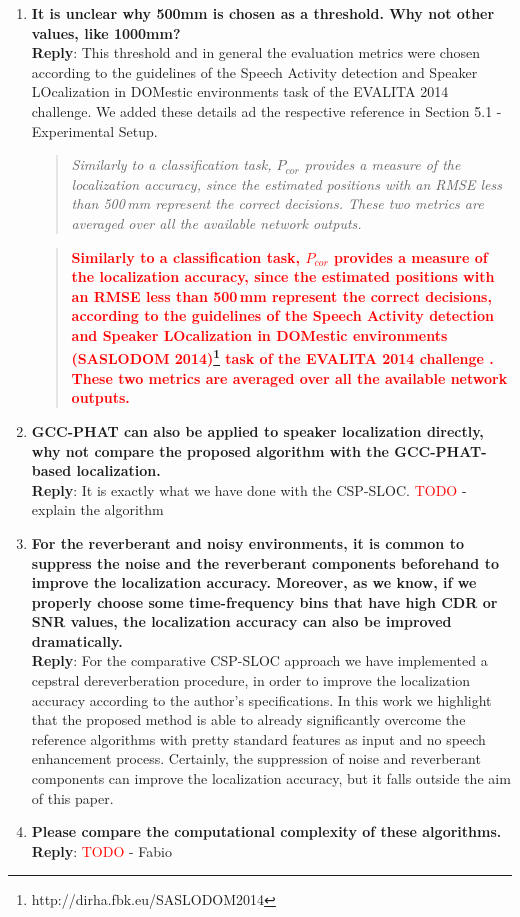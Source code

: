 \documentclass[11pt, technote, letterpaper, oneside, onecolumn]{IEEEtran}
\begin{document}
\begin{enumerate}
\item  \textbf{It is unclear why 500mm is chosen as a threshold. Why not other values, like 1000mm?\\}
\textbf{Reply}: This threshold and in general the evaluation metrics were chosen according to the guidelines of the Speech Activity detection and Speaker LOcalization in DOMestic environments task of the EVALITA 2014 challenge. We added these details ad the respective reference in Section 5.1 - Experimental Setup.
\begin{quote}
	\textit{Similarly to a classification task, $P_{cor}$ provides a measure of the localization accuracy, since the estimated positions with an RMSE less than 500\,mm represent the correct decisions. These two metrics are averaged over all the available network outputs.}
\end{quote}

\begin{quote}
	\textcolor{red}{\textbf{Similarly to a classification task, $P_{cor}$ provides a measure of the localization accuracy, since the estimated positions with an RMSE less than 500\,mm represent the correct decisions, according to the guidelines of the Speech Activity detection and Speaker LOcalization in DOMestic environments (SASLODOM 2014)\footnote{http://dirha.fbk.eu/SASLODOM2014} task of the EVALITA 2014 challenge \cite{basili2014proceedings}. These two metrics are averaged over all the available network outputs.}}
\end{quote}

\item  \textbf{GCC-PHAT can also be applied to speaker localization directly, why not compare the proposed algorithm with the GCC-PHAT-based localization. \\}
\textbf{Reply}:  It is exactly what we have done with the CSP-SLOC. \textcolor{red}{TODO} - explain the algorithm

\item  \textbf{For the reverberant and noisy environments, it is common to suppress the noise and the reverberant components beforehand to improve the localization accuracy. Moreover, as we know, if we properly choose some time-frequency bins that have high CDR or SNR values, the localization accuracy can also be improved dramatically.\\}
\textbf{Reply}: For the comparative CSP-SLOC approach we have implemented a cepstral dereverberation procedure, in order to improve the localization accuracy according to the author's specifications. In this work we highlight that the proposed method is able to already significantly overcome the reference algorithms with pretty standard features as input and no speech enhancement process. Certainly, the suppression of noise and reverberant components can improve the localization accuracy, but it falls outside the aim of this paper.

\item  \textbf{Please compare the computational complexity of these algorithms.\\}
\textbf{Reply}: \textcolor{red}{TODO} - Fabio

\end{enumerate}
\end{document}
